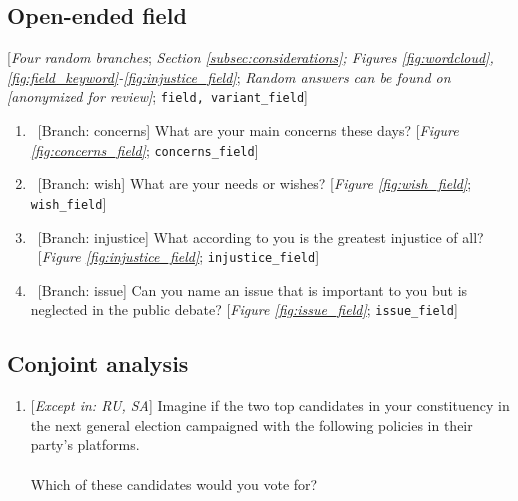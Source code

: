 \documentclass[12pt,english]{article}
\begin{document}
\begin{bibunit}
\begin{enumerate}[resume]

\end{enumerate} 

 \subsection*{Open-ended field} 
 [\textit{Four random branches}; \textit{Section \ref{subsec:considerations}; Figures \ref{fig:wordcloud}, \ref{fig:field_keyword}-\ref{fig:injustice_field}}; \textit{Random answers can be found on [anonymized for review]}; 
 \verb|field, variant_field|] 
 \begin{enumerate}[resume] 
\item  \label{q:concerns_field} ~[Branch: concerns] What are your main concerns these days? [\textit{Figure \ref{fig:concerns_field}}; 
\verb|concerns_field|]


\item  \label{q:wish_field} ~[Branch: wish] What are your needs or wishes? [\textit{Figure \ref{fig:wish_field}}; 
\verb|wish_field|]


\item  \label{q:injustice_field} ~[Branch: injustice] What according to you is the greatest injustice of all?\\ 
~[\textit{Figure \ref{fig:injustice_field}}; 
\verb|injustice_field|]


\item  \label{q:issue_field} ~[Branch: issue] Can you name an issue that is important to you but is neglected in the public debate? [\textit{Figure \ref{fig:issue_field}}; 
\verb|issue_field|]


\end{enumerate} 

 \subsection*{Conjoint analysis} 
 \begin{enumerate}[resume] 
\item  \label{q:conjoint} [\textit{Except in: RU, SA}] Imagine if the two top candidates in your constituency in the next general election campaigned with the following policies in their party's platforms. \\\\Which of these candidates would you vote for?  
~\\


\end{enumerate}
\end{bibunit}
\end{document}

